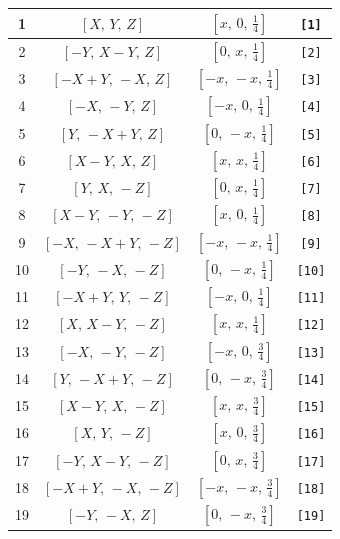 \documentclass[fleqn,8pt]{jsarticle}
\begin{document}
\begin{longtable}{cccc}
1 & $\left[ X,\, Y,\, Z \right]$ & $\left[ x,\, 0,\, \frac{1}{4} \right]$ & {\tt [1]} \\ \hline
2 & $\left[ - Y,\, X - Y,\, Z \right]$ & $\left[ 0,\, x,\, \frac{1}{4} \right]$ & {\tt [2]} \\ \hline
3 & $\left[ - X + Y,\, - X,\, Z \right]$ & $\left[ - x,\, - x,\, \frac{1}{4} \right]$ & {\tt [3]} \\ \hline
4 & $\left[ - X,\, - Y,\, Z \right]$ & $\left[ - x,\, 0,\, \frac{1}{4} \right]$ & {\tt [4]} \\ \hline
5 & $\left[ Y,\, - X + Y,\, Z \right]$ & $\left[ 0,\, - x,\, \frac{1}{4} \right]$ & {\tt [5]} \\ \hline
6 & $\left[ X - Y,\, X,\, Z \right]$ & $\left[ x,\, x,\, \frac{1}{4} \right]$ & {\tt [6]} \\ \hline
7 & $\left[ Y,\, X,\, - Z \right]$ & $\left[ 0,\, x,\, \frac{1}{4} \right]$ & {\tt [7]} \\ \hline
8 & $\left[ X - Y,\, - Y,\, - Z \right]$ & $\left[ x,\, 0,\, \frac{1}{4} \right]$ & {\tt [8]} \\ \hline
9 & $\left[ - X,\, - X + Y,\, - Z \right]$ & $\left[ - x,\, - x,\, \frac{1}{4} \right]$ & {\tt [9]} \\ \hline
10 & $\left[ - Y,\, - X,\, - Z \right]$ & $\left[ 0,\, - x,\, \frac{1}{4} \right]$ & {\tt [10]} \\ \hline
11 & $\left[ - X + Y,\, Y,\, - Z \right]$ & $\left[ - x,\, 0,\, \frac{1}{4} \right]$ & {\tt [11]} \\ \hline
12 & $\left[ X,\, X - Y,\, - Z \right]$ & $\left[ x,\, x,\, \frac{1}{4} \right]$ & {\tt [12]} \\ \hline
13 & $\left[ - X,\, - Y,\, - Z \right]$ & $\left[ - x,\, 0,\, \frac{3}{4} \right]$ & {\tt [13]} \\ \hline
14 & $\left[ Y,\, - X + Y,\, - Z \right]$ & $\left[ 0,\, - x,\, \frac{3}{4} \right]$ & {\tt [14]} \\ \hline
15 & $\left[ X - Y,\, X,\, - Z \right]$ & $\left[ x,\, x,\, \frac{3}{4} \right]$ & {\tt [15]} \\ \hline
16 & $\left[ X,\, Y,\, - Z \right]$ & $\left[ x,\, 0,\, \frac{3}{4} \right]$ & {\tt [16]} \\ \hline
17 & $\left[ - Y,\, X - Y,\, - Z \right]$ & $\left[ 0,\, x,\, \frac{3}{4} \right]$ & {\tt [17]} \\ \hline
18 & $\left[ - X + Y,\, - X,\, - Z \right]$ & $\left[ - x,\, - x,\, \frac{3}{4} \right]$ & {\tt [18]} \\ \hline
19 & $\left[ - Y,\, - X,\, Z \right]$ & $\left[ 0,\, - x,\, \frac{3}{4} \right]$ & {\tt [19]} \\ \hline

\end{longtable}
\end{document}
